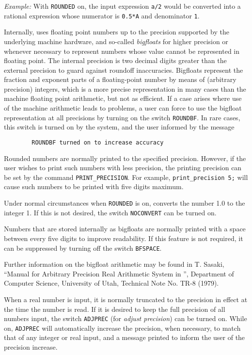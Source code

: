{\it Example:} With {\tt ROUNDED} on, the input expression {\tt a/2} would
be converted into a rational expression whose numerator is {\tt 0.5*A} and
denominator {\tt 1}.

Internally, {\REDUCE} uses floating point numbers up to the precision
supported by the underlying machine hardware, and so-called {\em
bigfloats} for higher precision or whenever necessary to represent numbers
whose value cannot be represented in floating point.  The internal
precision is two decimal digits greater than the external precision to
guard against roundoff inaccuracies.  Bigfloats represent the fraction and
exponent parts of a floating-point number by means of (arbitrary
precision) integers, which is a more precise representation in many cases
than the machine floating point arithmetic, but not as efficient.  If a
case arises where use of the machine arithmetic leads to problems, a user
can force {\REDUCE} to use the bigfloat representation at all precisions by
turning on the switch {\tt ROUNDBF}.  In rare cases,
this switch is turned on by the system, and the user informed by the
message
\begin{verbatim}
        ROUNDBF turned on to increase accuracy
\end{verbatim}

Rounded numbers are normally printed to the specified precision.  However,
if the user wishes to print such numbers with less precision, the printing
precision can be set by the command {\tt PRINT\_PRECISION}.
 For example, {\tt print\_precision 5;} will
cause such numbers to be printed with five digits maximum.

Under normal circumstances when {\tt ROUNDED} is on, {\REDUCE} converts the
number 1.0 to the integer 1.  If this is not desired, the switch
{\tt NOCONVERT} can be turned on.

Numbers that are stored internally as bigfloats are normally printed with
a space between every five digits to improve readability.  If this
feature is not required, it can be suppressed by turning off the switch
{\tt BFSPACE}.

Further information on the bigfloat arithmetic may be found in T. Sasaki,
``Manual for Arbitrary Precision Real Arithmetic System in {\REDUCE}'',
Department of Computer Science, University of Utah, Technical Note No.
TR-8 (1979).

When a real number is input, it is normally truncated to the precision in
effect at the time the number is read.  If it is desired to keep the full
precision of all numbers input, the switch {\tt ADJPREC}
(for {\em adjust precision\/}) can be turned on.  While on, {\tt ADJPREC}
will automatically increase the precision, when necessary, to match that
of any integer or real input, and a message printed to inform the user of
the precision increase.

